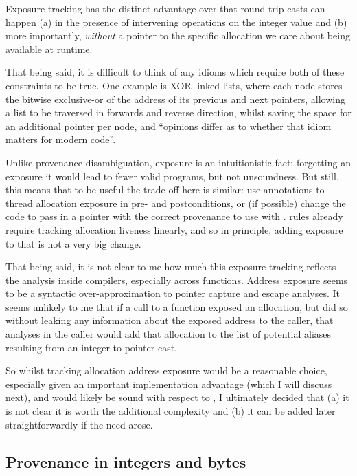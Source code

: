 Exposure tracking has the distinct advantage over  that round-trip
casts can happen (a) in the presence of intervening operations on the integer
value and (b) more importantly, \emph{without} a pointer to the specific
allocation we care about being available at runtime.

That being said, it is difficult to think of any idioms which require both of
these constraints to be true. One example is XOR linked-lists, where each node
stores the bitwise exclusive-or of the address of its previous and next
pointers, allowing a list to be traversed in forwards and reverse direction,
whilst saving the space for an additional pointer per node, and ``opinions
differ as to whether that idiom matters for modern
code''.

Unlike provenance disambiguation, exposure is an intuitionistic fact:
forgetting an exposure it would lead to fewer valid programs, but not
unsoundness. But still, this means that to be useful the trade-off here is
similar: use annotations to thread allocation exposure in pre- and
postconditions, or (if possible) change the code to pass in a pointer with the
correct provenance to use with .  rules
already require tracking allocation liveness linearly, and so in principle,
adding exposure to that is not a very big change.

That being said, it is not clear to me how much this exposure tracking reflects
the analysis inside compilers, especially across functions. Address exposure
seems to be a syntactic over-approximation to pointer capture and escape
analyses.
It seems unlikely to me that if a call to a function exposed an
allocation, but did so without leaking any information about the exposed
address to the caller, that analyses in the caller would add that allocation to
the list of potential aliases resulting from an integer-to-pointer cast.

So whilst tracking allocation address exposure would be a reasonable choice,
especially given an important implementation advantage (which I will discuss
next), and would likely be sound with respect to , I ultimately
decided that (a) it is not clear it is worth the additional complexity and (b)
it can be added later straightforwardly if the need arose.

\subsection{Provenance in integers and bytes}\label{subsec:prov-int-bytes}

